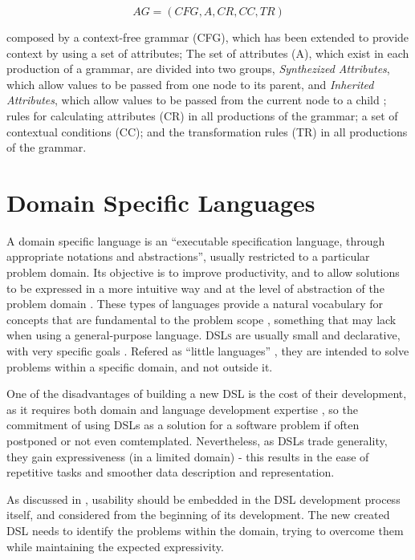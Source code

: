 \[ AG = (CFG, A, CR, CC, TR) \]

\noindent composed by a context-free grammar (CFG), which has been extended to provide context by using a set of attributes; 
The set of attributes (A), which exist in each production of a grammar, are divided into two groups, \emph{Synthezized Attributes}, which allow values to be passed from one node to its parent, 
and \emph{Inherited Attributes}, which allow values to be passed from the current node to a child \cite{slonneger_1995}; 
rules for calculating attributes (CR) in all productions of the grammar; 
a set of contextual conditions (CC); 
and the transformation rules (TR) in all productions of the grammar.


\section{Domain Specific Languages}
A domain specific language is an ``executable specification language, through appropriate notations and abstractions'', usually restricted to a particular problem domain. 
Its objective is to improve productivity, and to allow solutions to be expressed in a more intuitive way and at the level of abstraction of the problem domain \cite{van_2000}.
These types of languages provide a natural vocabulary for concepts that are fundamental to the problem scope \cite{bruce_1997}, something that may lack when using a general-purpose language. 
\textsc{DSLs} are usually small and declarative, with very specific goals \cite{van_2000}.
Refered as ``little languages'' \cite{bentley_1986}, they are intended to solve problems within a specific domain, and not outside it.

One of the disadvantages of building a new \textsc{DSL} is the cost of their development, as it requires both domain and language development expertise \cite{kosar_2008},
so the commitment of using \textsc{DSL}s as a solution for a software problem if often postponed or not even comtemplated.
Nevertheless, as \textsc{DSL}s trade generality, they gain expressiveness (in a limited domain) - this results in the ease of repetitive tasks and smoother data
description \cite{mernik_2005} and representation.

As discussed in \cite{barisic_2012}, usability should be embedded in the \textsc{DSL} development process itself, and considered from the beginning of its development.
The new created \textsc{DSL} needs to identify the problems within the domain, trying to overcome them while maintaining the expected expressivity.


